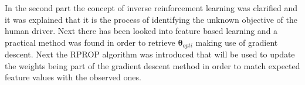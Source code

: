 In the second part the concept of inverse reinforcement learning was clarified and it was explained that it is the process of identifying the unknown objective of the human driver. Next there has been looked into feature based learning and a practical method was found in order to retrieve $\bm{\theta}_{opti}$ making use of gradient descent. Next the RPROP algorithm was introduced that will be used to update the weights being part of the gradient descent method in order to match expected feature values with the observed ones.

\newpage


%

